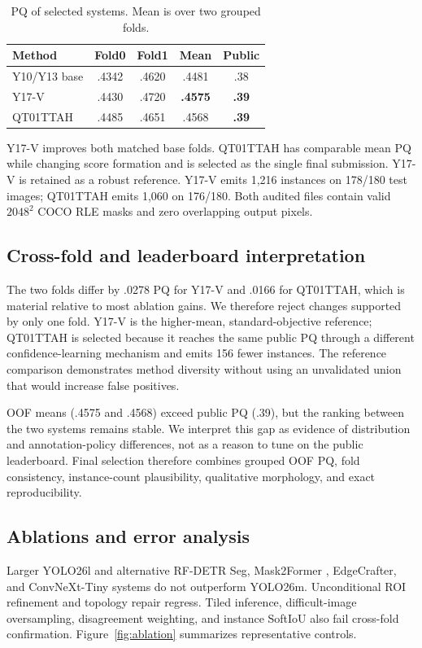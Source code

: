 \documentclass[sigconf]{acmart}
\begin{document}
\begin{table}[t]
\centering
\caption{PQ of selected systems. Mean is over two grouped folds.}
\label{tab:main}
\small
\begin{tabular}{lcccc}
\toprule
Method & Fold0 & Fold1 & Mean & Public \\
\midrule
Y10/Y13 base & .4342 & .4620 & .4481 & .38 \\
Y17-V & .4430 & .4720 & \textbf{.4575} & \textbf{.39} \\
QT01TTAH & .4485 & .4651 & .4568 & \textbf{.39} \\
\bottomrule
\end{tabular}
\end{table}

Y17-V improves both matched base folds. QT01TTAH has comparable mean PQ while changing score
formation and is selected as the single final submission. Y17-V is retained as a robust reference.
Y17-V emits 1,216 instances on 178/180 test
images; QT01TTAH emits 1,060 on 176/180. Both audited files contain valid $2048^2$ COCO RLE masks
and zero overlapping output pixels.

\subsection{Cross-fold and leaderboard interpretation}
The two folds differ by .0278 PQ for Y17-V and .0166 for QT01TTAH, which is material relative to most
ablation gains. We therefore reject changes supported by only one fold. Y17-V is the higher-mean,
standard-objective reference; QT01TTAH is selected because it reaches the same public PQ through a
different confidence-learning mechanism and emits 156 fewer instances. The reference comparison
demonstrates method diversity without using an unvalidated union that would increase false positives.

OOF means (.4575 and .4568) exceed public PQ (.39), but the ranking between the two systems remains
stable. We interpret this gap as evidence of distribution and annotation-policy differences, not as
a reason to tune on the public leaderboard. Final selection therefore combines grouped OOF PQ,
fold consistency, instance-count plausibility, qualitative morphology, and exact reproducibility.

\subsection{Ablations and error analysis}
Larger YOLO26l and alternative RF-DETR Seg, Mask2Former \cite{cheng2022mask2former}, EdgeCrafter,
and ConvNeXt-Tiny \cite{liu2022convnext} systems do not outperform YOLO26m. Unconditional ROI
refinement and topology repair regress. Tiled inference, difficult-image oversampling, disagreement
weighting, and instance SoftIoU also fail cross-fold confirmation. Figure~\ref{fig:ablation}
summarizes representative controls.
\end{document}
